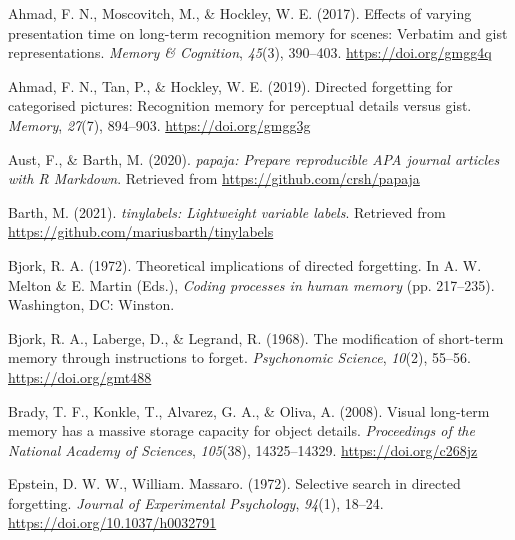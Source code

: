 \documentclass[
  man,floatsintext]{apa6}
\newlength{\cslhangindent}
\newlength{\cslentryspacingunit} %
\newenvironment{CSLReferences}[2] %
 {%
  \setlength{\parindent}{0pt}
  \ifodd #1
  \let\oldpar\par
  \def\par{\hangindent=\cslhangindent\oldpar}
  \fi
  \setlength{\parskip}{#2\cslentryspacingunit}
 }%
 {}
\begin{document}
\hypertarget{refs}{}
\begin{CSLReferences}{1}{0}
\leavevmode{}%
Ahmad, F. N., Moscovitch, M., \& Hockley, W. E. (2017). Effects of varying presentation time on long-term recognition memory for scenes: {Verbatim} and gist representations. \emph{Memory \& Cognition}, \emph{45}(3), 390--403. \url{https://doi.org/gmgg4q}

\leavevmode{}%
Ahmad, F. N., Tan, P., \& Hockley, W. E. (2019). Directed forgetting for categorised pictures: Recognition memory for perceptual details versus gist. \emph{Memory}, \emph{27}(7), 894--903. \url{https://doi.org/gmgg3g}

\leavevmode{}%
Aust, F., \& Barth, M. (2020). \emph{{papaja}: {Prepare} reproducible {APA} journal articles with {R Markdown}}. Retrieved from \url{https://github.com/crsh/papaja}

\leavevmode{}%
Barth, M. (2021). \emph{{tinylabels}: Lightweight variable labels}. Retrieved from \url{https://github.com/mariusbarth/tinylabels}

\leavevmode{}%
Bjork, R. A. (1972). Theoretical implications of directed forgetting. In A. W. Melton \& E. Martin (Eds.), \emph{Coding processes in human memory} (pp. 217--235). {Washington, DC}: {Winston}.

\leavevmode{}%
Bjork, R. A., Laberge, D., \& Legrand, R. (1968). The modification of short-term memory through instructions to forget. \emph{Psychonomic Science}, \emph{10}(2), 55--56. \url{https://doi.org/gmt488}

\leavevmode{}%
Brady, T. F., Konkle, T., Alvarez, G. A., \& Oliva, A. (2008). Visual long-term memory has a massive storage capacity for object details. \emph{Proceedings of the National Academy of Sciences}, \emph{105}(38), 14325--14329. \url{https://doi.org/c268jz}

\leavevmode{}%
Epstein, D. W. W., William. Massaro. (1972). Selective search in directed forgetting. \emph{Journal of Experimental Psychology}, \emph{94}(1), 18--24. \url{https://doi.org/10.1037/h0032791}


\end{CSLReferences}
\end{document}
